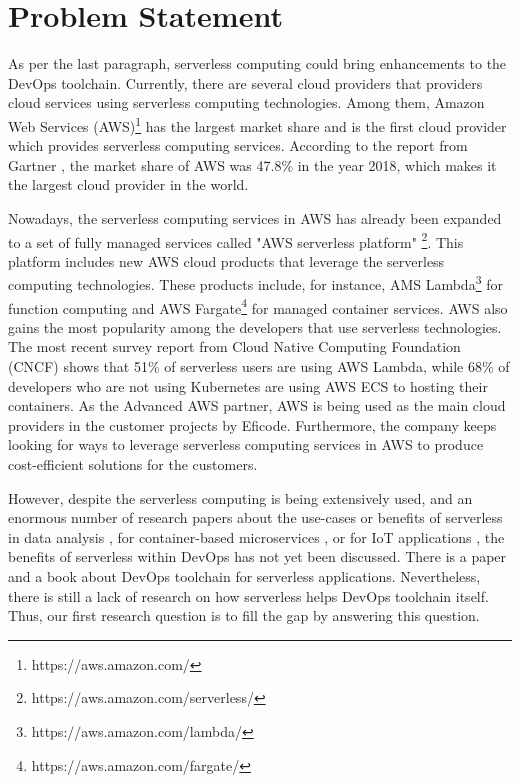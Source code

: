 \section{Problem Statement}
As per the last paragraph, serverless computing could bring enhancements to the DevOps toolchain. Currently, there are several cloud providers that providers cloud services using serverless computing technologies. 
Among them, Amazon Web Services (AWS)\footnote{https://aws.amazon.com/} has the largest market share and is the first cloud provider which provides serverless computing services. According to the report from Gartner \cite{GartnerS47:online}, the market share of AWS was 47.8\% in the year 2018, which makes it the largest cloud provider in the world.
\par
Nowadays, the serverless computing services in AWS has already been expanded to a set of fully managed services called "AWS serverless platform" \footnote{https://aws.amazon.com/serverless/}. This platform includes new AWS cloud products that leverage the serverless computing technologies. These products include, for instance, AMS Lambda\footnote{https://aws.amazon.com/lambda/} for function computing and AWS Fargate\footnote{https://aws.amazon.com/fargate/} for managed container services.
AWS also gains the most popularity among the developers that use serverless technologies. The most recent survey report \cite{cncf2020} from Cloud Native Computing Foundation (CNCF) shows that 51\% of serverless users are using AWS Lambda, while 68\% of developers who are not using Kubernetes are using AWS ECS to hosting their containers.
As the Advanced AWS partner, AWS is being used as the main cloud providers in the customer projects by Eficode. Furthermore, the company keeps looking for ways to leverage serverless computing services in AWS to produce cost-efficient solutions for the customers.
\par
However, despite the serverless computing is being extensively used, and an enormous number of research papers about the use-cases or benefits of serverless in data analysis \cite{8457831}, for container-based microservices \cite{perez2018serverless}, or for IoT applications \cite{nastic2017serverless} \cite{glikson2017deviceless}, the benefits of serverless within DevOps has not yet been discussed. There is a paper \cite{ivanov2018implementation} and a book \cite{bangera2018devops} about DevOps toolchain for serverless applications. Nevertheless, there is still a lack of research on how serverless helps DevOps toolchain itself. Thus, our first research question is to fill the gap by answering this question. 
